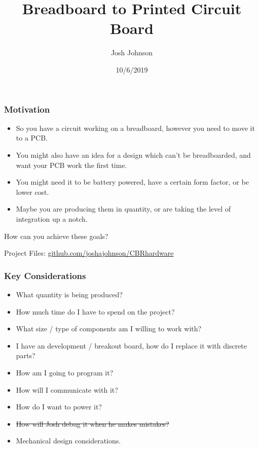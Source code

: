 \documentclass[t]{beamer}
\title[]{Breadboard to Printed Circuit Board} %
\author{Josh Johnson} %
\institute[] %
{ \\ %
\medskip
\textit{} %
}
\date{10/6/2019} %
\begin{document}
\begin{frame}
\titlepage %
\end{frame}



\begin{frame}
\frametitle{Motivation}
\begin{itemize}
	\item So you have a circuit working on a breadboard, however you need to move it to a PCB.
	\item You might also have an idea for a design which can't be breadboarded, and want your PCB work the first time.
	\item You might need it to be battery powered, have a certain form factor, or be lower cost.
	\item Maybe you are producing them in quantity, or are taking the level of integration up a notch.
\end{itemize}
\vspace{3mm}
How can you achieve these goals? 



\vspace{15mm}
Project Files: \url{github.com/joshajohnson/CBRhardware}\\
\end{frame}


\begin{frame}[t]
\frametitle{Key Considerations}

\begin{itemize}
	\item What quantity is being produced?
	\item How much time do I have to spend on the project?
	\item What size / type of components am I willing to work with?
	\item I have an development / breakout board, how do I replace it with discrete parts?
	\item How am I going to program it?
	\item How will I communicate with it?
	\item How do I want to power it?
	\item \sout{How will Josh debug it when he makes mistakes?} 
	\item Mechanical design considerations. 
\end{itemize}

\end{frame}
\end{document}
